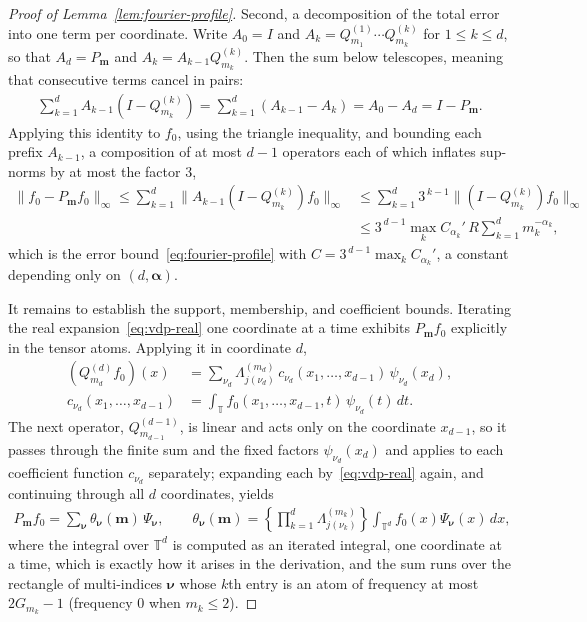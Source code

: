 \begin{proof}[Proof of Lemma~\ref{lem:fourier-profile}]
Second, a decomposition of the total error into one term per coordinate. Write $A_0=I$ and $A_k=Q_{m_1}^{(1)}\cdots Q_{m_k}^{(k)}$ for $1\leq k\leq d$, so that $A_d=P_{\boldsymbol m}$ and $A_k=A_{k-1}Q_{m_k}^{(k)}$. Then the sum below telescopes, meaning that consecutive terms cancel in pairs:
\begin{align*}
\sum_{k=1}^dA_{k-1}(I-Q_{m_k}^{(k)})
=\sum_{k=1}^d(A_{k-1}-A_k)
=A_0-A_d
=I-P_{\boldsymbol m}.
\end{align*}
Applying this identity to $f_0$, using the triangle inequality, and bounding each prefix $A_{k-1}$, a composition of at most $d-1$ operators each of which inflates sup-norms by at most the factor $3$,
\begin{align*}
\|f_0-P_{\boldsymbol m}f_0\|_\infty
\leq\sum_{k=1}^d\|A_{k-1}(I-Q_{m_k}^{(k)})f_0\|_\infty
&\leq\sum_{k=1}^d3^{\,k-1}\|(I-Q_{m_k}^{(k)})f_0\|_\infty\\
&\leq3^{\,d-1}\max_kC_{\alpha_k}'\,R\sum_{k=1}^dm_k^{-\alpha_k},
\end{align*}
which is the error bound~\eqref{eq:fourier-profile} with $C=3^{\,d-1}\max_kC_{\alpha_k}'$, a constant depending only on $(d,\boldsymbol\alpha)$.

It remains to establish the support, membership, and coefficient bounds. Iterating the real expansion~\eqref{eq:vdp-real} one coordinate at a time exhibits $P_{\boldsymbol m}f_0$ explicitly in the tensor atoms. Applying it in coordinate $d$,
\begin{align*}
(Q_{m_d}^{(d)}f_0)(x)
&=\sum_{\nu_d}\Lambda^{(m_d)}_{j(\nu_d)}\,c_{\nu_d}(x_1,\ldots,x_{d-1})\,\psi_{\nu_d}(x_d),\\
c_{\nu_d}(x_1,\ldots,x_{d-1})
&=\int_{\mathbb T}f_0(x_1,\ldots,x_{d-1},t)\,\psi_{\nu_d}(t)\,dt.
\end{align*}
The next operator, $Q_{m_{d-1}}^{(d-1)}$, is linear and acts only on the coordinate $x_{d-1}$, so it passes through the finite sum and the fixed factors $\psi_{\nu_d}(x_d)$ and applies to each coefficient function $c_{\nu_d}$ separately; expanding each by~\eqref{eq:vdp-real} again, and continuing through all $d$ coordinates, yields
\begin{align}
P_{\boldsymbol m}f_0
=\sum_{\boldsymbol\nu}\theta_{\boldsymbol\nu}(\boldsymbol m)\,\Psi_{\boldsymbol\nu},
\qquad
\theta_{\boldsymbol\nu}(\boldsymbol m)
=\left\{\prod_{k=1}^d\Lambda^{(m_k)}_{j(\nu_k)}\right\}
\int_{\mathbb T^d}f_0(x)\Psi_{\boldsymbol\nu}(x)\,dx,
\label{eq:tensor-coefficients}
\end{align}
where the integral over $\mathbb T^d$ is computed as an iterated integral, one coordinate at a time, which is exactly how it arises in the derivation, and the sum runs over the rectangle of multi-indices $\boldsymbol\nu$ whose $k$th entry is an atom of frequency at most $2G_{m_k}-1$ (frequency $0$ when $m_k\leq2$).


\end{proof}
